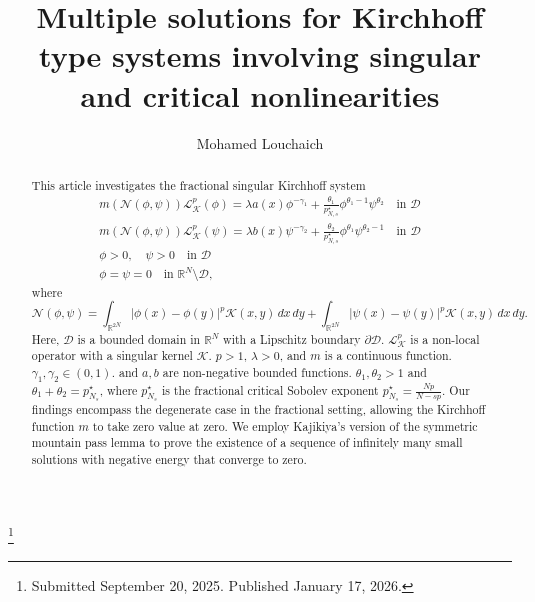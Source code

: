 \documentclass[reqno]{amsart}
\begin{document}
\title[\hfilneg EJDE-2026/05\hfil Multiple solutions for Kirchhoff type systems]
{Multiple solutions for Kirchhoff type systems involving singular and critical nonlinearities}

\author[M. Louchaich \hfil EJDE-2026/05\hfilneg]
{Mohamed Louchaich}

\address{Mohamed Louchaich \newline
High school of sciences and technology, 
Sousse University,
4011 Hammam Sousse, Tunisia}

\thanks{Submitted September 20, 2025. Published January 17, 2026.}

\begin{abstract}
This article investigates the fractional singular Kirchhoff system
\begin{gather*}
m(\mathcal{N}(\phi,\psi))\mathcal{L}_\mathcal{K}^p(\phi)
=\lambda a(x)\phi^{-\gamma_1}+\frac{\theta_1}{p^\star_{N,s}}\phi^{\theta_1-1}
\psi^{\theta_2} \quad \text{in } \mathcal{D} \\
m(\mathcal{N}(\phi,\psi))\mathcal{L}_\mathcal{K}^p(\psi)
=\lambda b(x)\psi^{-\gamma_2}+\frac{\theta_2}{p^\star_{N,s}}\phi^{\theta_1}
 \psi^{\theta_2-1} \quad \text{in } \mathcal{D} \\
\phi>0,\quad \psi>0  \quad\text{in } \mathcal{D} \\
\phi=\psi=0 \quad \text{in } \mathbb{R}^N\setminus \mathcal{D},
\end{gather*}
where
$$
\mathcal{N}(\phi,\psi)=\int_{\mathbb{R}^{2N}}|\phi(x)-\phi(y)|^p \mathcal{K}(x,y)\,dx\,dy
+\int_{\mathbb{R}^{2N}}|\psi(x)-\psi(y)|^p\mathcal{K}(x,y)\,dx\,dy.
$$
Here, $\mathcal{D}$ is a bounded domain in $\mathbb{R}^N$ with a
Lipschitz boundary  $\partial\mathcal{D}$.
$\mathcal{L}_\mathcal{K}^p$ is a non-local operator with
a singular kernel $\mathcal{K}$.
$p> 1$, $\lambda>0$, and $m$ is a continuous function.
$\gamma_1,\gamma_2\in (0,1)$. and $a,b$ are  non-negative bounded functions.
$\theta_1,\theta_2>1$ and $\theta_1+\theta_2=p^\star_{N_s}$,
where $p^\star_{N_s}$ is the fractional critical Sobolev exponent
$p^\star_{N_s}=\frac{Np}{N-sp}$.
Our findings encompass the degenerate case in the fractional
setting, allowing the Kirchhoff function $m$ to take zero value at zero.
We employ Kajikiya's version of the symmetric mountain pass lemma to prove the
existence of a sequence of infinitely many small solutions with negative energy
that converge to zero.
\end{abstract}
\end{document}
